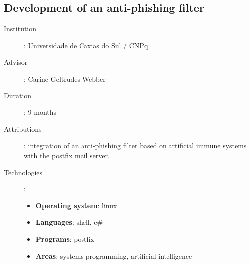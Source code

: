 \subsection*{Development of an anti-phishing filter}

\begin{description}
    \item[Institution]: Universidade de Caxias do Sul / CNPq
    \item[Advisor]: Carine Geltrudes Webber
    \item[Duration]: 9 months
    \item[Attributions]:
        integration of an anti-phishing filter based on artificial immune
        systems with the postfix mail server.
    \item[Technologies]:
        \begin{itemize}
            \item \textbf{Operating system}: linux
            \item \textbf{Languages}: shell, c\#
            \item \textbf{Programs}: postfix
            \item \textbf{Areas}: systems programming, artificial intelligence
        \end{itemize}
\end{description}
